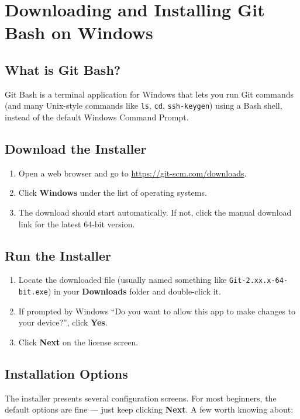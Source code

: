 \documentclass[main.tex]{subfiles}
\begin{document}
\section{Downloading and Installing Git Bash on Windows}

\subsection{What is Git Bash?}
Git Bash is a terminal application for Windows that lets you run
Git commands (and many Unix-style commands like \texttt{ls}, \texttt{cd},
\texttt{ssh-keygen}) using a Bash shell, instead of the default
Windows Command Prompt.

\subsection{Download the Installer}
\begin{enumerate}[leftmargin=*]
    \item Open a web browser and go to \url{https://git-scm.com/downloads}.
    \item Click \textbf{Windows} under the list of operating systems.
    \item The download should start automatically. If not, click the
    manual download link for the latest 64-bit version.
\end{enumerate}

\subsection{Run the Installer}
\begin{enumerate}[leftmargin=*]
    \item Locate the downloaded file (usually named something like
    \texttt{Git-2.xx.x-64-bit.exe}) in your \textbf{Downloads} folder
    and double-click it.
    \item If prompted by Windows ``Do you want to allow this app to
    make changes to your device?'', click \textbf{Yes}.
    \item Click \textbf{Next} on the license screen.
\end{enumerate}

\subsection{Installation Options}
The installer presents several configuration screens. For most
beginners, the default options are fine — just keep clicking
\textbf{Next}. A few worth knowing about:
\end{document}
